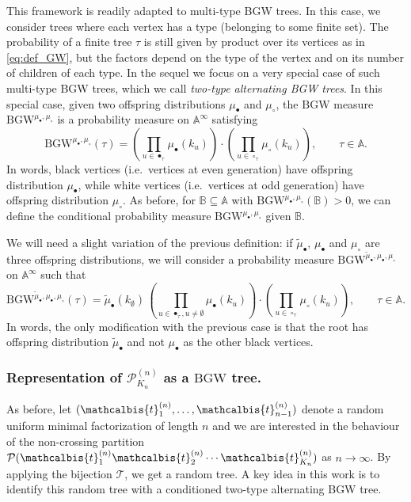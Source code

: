 \documentclass[AHL,XML,longabstracts,Unicode]{cedram}
\def\PPP{\mathcal P}
\def\tmub{\widetilde{\mu}_{\bullet}}
\def\PKn{\mathcal{P}^{(n)}_{K_{n}}}
\def\mub{\mu_{\bullet}}
\def\muc{\mu_{\circ}}
\newcommand\BGW{\textrm{BGW}}
\def\tb{\mathcalbis{t}}
\begin{document}
This framework is readily adapted to  multi-type BGW trees.
In this case, we consider trees where each vertex has a type (belonging to some finite set).
The probability of a finite tree $\tau$ is still given by product over its vertices as in \eqref{eq:def_GW},
but the factors depend on the type of the vertex and on its number of children of each type.
In the sequel we focus on  a very special case of such multi-type BGW trees, which we call  {\em two-type alternating BGW trees}. In this special case, given two offspring distributions $\mub$ and $\muc$,
the $\mathrm{BGW}$ measure $\BGW^{\mub,\muc}$ is a probability measure on $\mathbb{A} ^{\infty}$ satisfying
\begin{equation}
\label{eq:def_GW2}
\BGW^{\mub,\muc}(\tau) = \left(  \prod_{u \in \bullet_{\tau}} \mub(k_u) \right) \cdot \left(  \prod_{u \in \circ_{\tau}} \muc(k_u) \right), \qquad \tau \in \mathbb{A}.
\end{equation}
In words, black vertices (i.e.\ vertices at even generation) have offspring distribution $\mub$,
while white vertices (i.e.\ vertices at odd generation) have offspring distribution $\muc$.
As before, for $\mathbb B \subseteq \mathbb A$ with $\BGW^{\mub,\muc}(\mathbb B)>0$, we can define
the conditional probability  measure $\BGW^{\mub,\muc}$ given  $\mathbb{B}$.


We will need a slight variation of the previous definition:
if $\tmub$, $\mub$ and $\muc$ are three offspring distributions,
we will consider a probability measure ${\BGW}^{\tmub,\mub,\muc}$ on $\mathbb{A} ^{\infty}$
such that
\begin{equation}
  \label{eq:BGWtilde}
  {\BGW}^{\tmub,\mub,\muc}(\tau)=\tmub(k_\emptyset) \, \left(  \prod_{u \in \bullet_{\tau},u\neq \emptyset} \mub(k_u) \right) \cdot \left(  \prod_{u \in \circ_{\tau}} \muc(k_u) \right), \qquad \tau \in \mathbb{A}.
\end{equation}
In words, the only modification with the previous case is that the
root has offspring distribution $\tmub$ and not $\mub$ as the other black vertices.


\subsubsection{Representation of $\PKn$ as a $\BGW$ tree.}
As before, let $(\tb_{1}^{(n)}, \ldots, \tb_{n-1}^{(n)})$ denote a random uniform minimal factorization of length $n$
and we are interested in the behaviour of the non-crossing partition
$\PPP(\tb_{1}^{(n)} \tb_{2}^{(n)} \cdots \tb_{K_{n}}^{(n)})$ as $n \rightarrow \infty$.
By applying the bijection $\mathcal T$, we get a random tree.
A key idea in this work is to identify this random tree
with a conditioned two-type alternating BGW tree.
\end{document}
